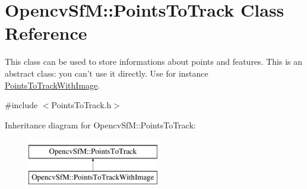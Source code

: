 \hypertarget{class_opencv_sf_m_1_1_points_to_track}{
\section{OpencvSfM::PointsToTrack Class Reference}
\label{class_opencv_sf_m_1_1_points_to_track}
}


This class can be used to store informations about points and features. This is an abstract class: you can't use it directly. Use for instance \hyperlink{class_opencv_sf_m_1_1_points_to_track_with_image}{PointsToTrackWithImage}.  




{\ttfamily \#include $<$PointsToTrack.h$>$}

Inheritance diagram for OpencvSfM::PointsToTrack:\begin{figure}[H]
\begin{center}
\leavevmode
\includegraphics[height=2.000000cm]{class_opencv_sf_m_1_1_points_to_track}
\end{center}
\end{figure}
